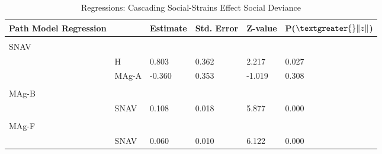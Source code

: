 \documentclass[utf8]{article}
\begin{document}
\begin{table}[]
\begin{tabular}{llllll}
Path Model Regression &       & Estimate & Std. Error & Z-value & P($\textgreater{}\|z\|$) \\ \hline
                      &       &          &            &         &                          \\
SNAV                  &       &          &            &         &                          \\
                      & H     & 0.803    & 0.362      & 2.217   & 0.027                    \\
                      & MAg-A & -0.360   & 0.353      & -1.019  & 0.308                    \\
                      &       &          &            &         &                          \\
MAg-B                 &       &          &            &         &                          \\
                      & SNAV  & 0.108    & 0.018      & 5.877   & 0.000                    \\
                      &       &          &            &         &                          \\
MAg-F                 &       &          &            &         &                          \\
                      & SNAV  & 0.060    & 0.010      & 6.122   & 0.000                   
\end{tabular}
\caption{Regressions: Cascading Social-Strains Effect Social Deviance\label{tab:11}}
\end{table}
\end{document}
